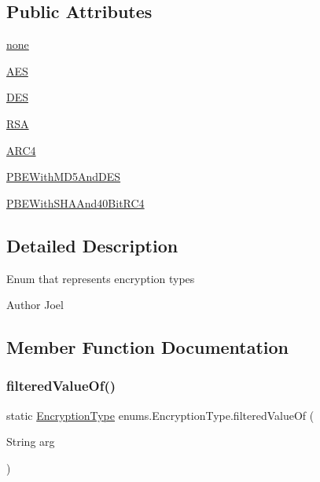 \subsection*{Public Attributes}
\begin{DoxyCompactItemize}
\item 
\mbox{\hyperlink{enumenums_1_1_encryption_type_a00696b3ecf5fa1be2d7148d244a9755f}{none}}
\item 
\mbox{\hyperlink{enumenums_1_1_encryption_type_a04b61e8116df22daab2d12f3e62b66cc}{A\+ES}}
\item 
\mbox{\hyperlink{enumenums_1_1_encryption_type_acc538687d6ca6c0f552c8a9ac4cf52c3}{D\+ES}}
\item 
\mbox{\hyperlink{enumenums_1_1_encryption_type_a4b6133b88233bcbe3fb031c306aadebb}{R\+SA}}
\item 
\mbox{\hyperlink{enumenums_1_1_encryption_type_a458a9c9b211fde2cdad29a8441c1d3c8}{A\+R\+C4}}
\item 
\mbox{\hyperlink{enumenums_1_1_encryption_type_abe0431eb5e6eefadb3007f7c6ef75660}{P\+B\+E\+With\+M\+D5\+And\+D\+ES}}
\item 
\mbox{\hyperlink{enumenums_1_1_encryption_type_aa05722ff606c8a5e5a6d331fd791f6a6}{P\+B\+E\+With\+S\+H\+A\+And40\+Bit\+R\+C4}}
\end{DoxyCompactItemize}


\subsection{Detailed Description}
Enum that represents encryption types \begin{DoxyAuthor}{Author}
Joel 
\end{DoxyAuthor}


\subsection{Member Function Documentation}
\mbox{\label{enumenums_1_1_encryption_type_aea9576b120c7941c9e2e96ee6e0d2db7}} 
\subsubsection{\texorpdfstring{filtered\+Value\+Of()}{filteredValueOf()}}
{\footnotesize\ttfamily static \mbox{\hyperlink{enumenums_1_1_encryption_type}{Encryption\+Type}} enums.\+Encryption\+Type.\+filtered\+Value\+Of (\begin{DoxyParamCaption}\item[{String}]{arg }\end{DoxyParamCaption})\hspace{0.3cm}{\ttfamily [static]}}

